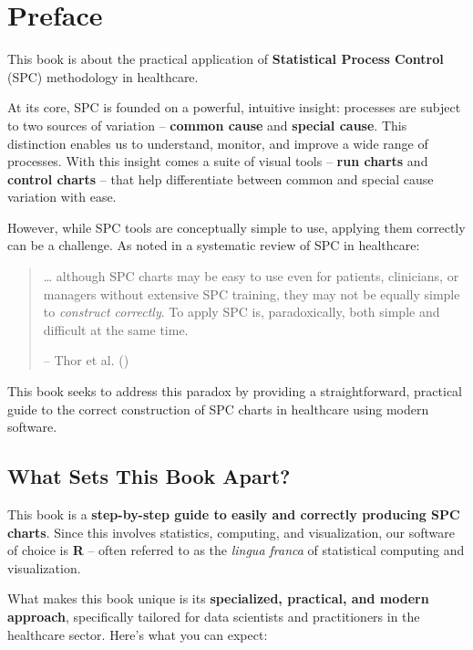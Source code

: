 \documentclass[
]{book}
\begin{document}
\chapter*{Preface}\label{preface}

This book is about the practical application of \textbf{Statistical Process Control} (SPC) methodology in healthcare.

At its core, SPC is founded on a powerful, intuitive insight: processes are subject to two sources of variation -- \textbf{common cause} and \textbf{special cause}. This distinction enables us to understand, monitor, and improve a wide range of processes. With this insight comes a suite of visual tools -- \textbf{run charts} and \textbf{control charts} -- that help differentiate between common and special cause variation with ease.

However, while SPC tools are conceptually simple to use, applying them correctly can be a challenge. As noted in a systematic review of SPC in healthcare:

\begin{quote}
\ldots{} although SPC charts may be easy to use even for patients, clinicians, or managers without extensive SPC training, they may not be equally simple to \emph{construct correctly}. To apply SPC is, paradoxically, both simple and difficult at the same time.

-- Thor et al. ()
\end{quote}

This book seeks to address this paradox by providing a straightforward, practical guide to the correct construction of SPC charts in healthcare using modern software.

\section*{What Sets This Book Apart?}\label{what-sets-this-book-apart}

This book is a \textbf{step-by-step guide to easily and correctly producing SPC charts}. Since this involves statistics, computing, and visualization, our software of choice is \textbf{R} -- often referred to as the \emph{lingua franca} of statistical computing and visualization.

What makes this book unique is its \textbf{specialized, practical, and modern approach}, specifically tailored for data scientists and practitioners in the healthcare sector. Here's what you can expect:
\end{document}

